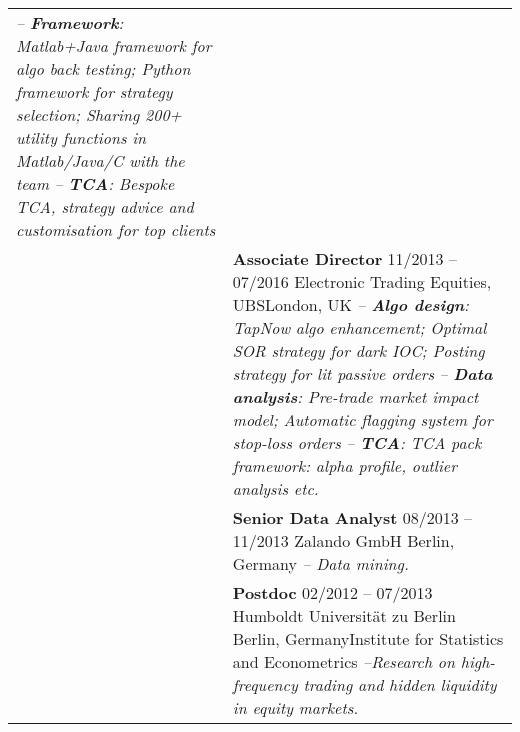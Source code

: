 \documentclass[a4paper,10pt]{article}
\begin{document}
\begin{longtable}[h]{p{}p{}}
    \emph{-- \textbf{Framework}: Matlab+Java framework for algo back testing; Python framework for strategy selection; Sharing 200+ utility functions in Matlab/Java/C with the team}\newline 
  \emph{-- \textbf{TCA}: Bespoke TCA, strategy advice and customisation for top clients}\\ 
  & \textbf{Associate Director} \hfill 11/2013 -- 07/2016 \newline Electronic Trading Equities, UBS\hfill London, UK\newline  
    \emph{-- \textbf{Algo design}: TapNow algo enhancement; Optimal SOR strategy for dark IOC; Posting strategy for lit passive orders} \newline
    \emph{-- \textbf{Data analysis}: Pre-trade market impact model; Automatic flagging system for stop-loss orders}\newline
    \emph{-- \textbf{TCA}: TCA pack framework: alpha profile, outlier analysis etc.}\\
  & \textbf{Senior Data Analyst} \hfill 08/2013 -- 11/2013 \newline Zalando GmbH \hfill Berlin, Germany \newline  \emph{-- Data mining.} \\
  & \textbf{Postdoc} \hfill 02/2012 -- 07/2013 \newline Humboldt Universit\"at zu Berlin \hfill Berlin, Germany\newline Institute for Statistics and Econometrics \newline \emph{--Research on high-frequency trading and hidden liquidity in equity markets.} \\


\end{longtable}
\end{document}

